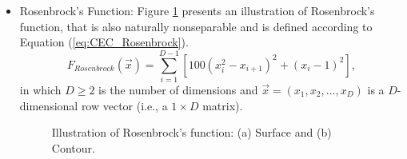 \begin{itemize}
  \item Rosenbrock's Function: Figure \ref{fig:CEC_Rosenbrock} presents an illustration of Rosenbrock's function, that is also naturally nonseparable and is defined according to Equation (\ref{eq:CEC_Rosenbrock}).
      \begin{equation}\label{eq:CEC_Rosenbrock}
      F_{Rosenbrock}(\vec{x}) = \sum_{i=1}^{D-1}[100(x_i^2 - x_{i+1})^2 + (x_i - 1)^2],
      \end{equation}
      in which $D \geq 2$ is the number of dimensions and $\vec{x} = (x_1, x_2, \ldots, x_D)$ is a $D$-dimensional row vector (i.e., a $1 \times D$ matrix).
      \begin{figure}[!h]
      \centering
      \hspace{1mm}
      \caption{Illustration of Rosenbrock's function: (a) Surface and (b) Contour.}
      \label{fig:CEC_Rosenbrock}
      \end{figure}


\end{itemize}
